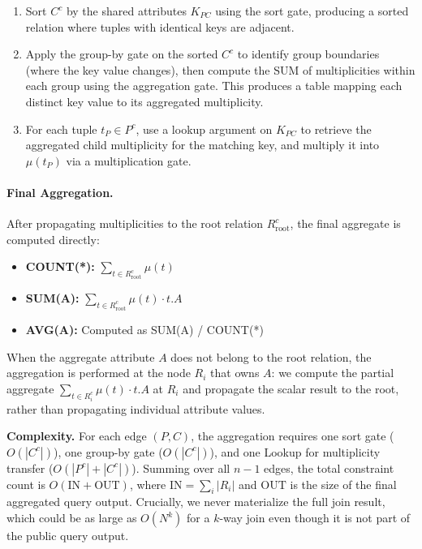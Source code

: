 \documentclass[sigconf]{acmart}
\begin{document}
\begin{enumerate}[leftmargin=*]
    \item Sort $C^c$ by the shared attributes $K_{PC}$ using the sort gate, producing a sorted relation where tuples with identical keys are adjacent.

    \item Apply the group-by gate on the sorted $C^c$ to identify group boundaries (where the key value changes), then compute the SUM of multiplicities within each group using the aggregation gate. This produces a table mapping each distinct key value to its aggregated multiplicity.

    \item For each tuple $t_P \in P^c$, use a lookup argument on $K_{PC}$ to retrieve the aggregated child multiplicity for the matching key, and multiply it into $\mu(t_P)$ via a multiplication gate.
\end{enumerate}

\paragraph{Final Aggregation.}
After propagating multiplicities to the root relation $R_{\text{root}}^c$, the final aggregate is computed directly:
\begin{itemize}[leftmargin=*]
    \item \textbf{COUNT(*):} $\sum_{t \in R_{\text{root}}^c} \mu(t)$
    \item \textbf{SUM(A):} $\sum_{t \in R_{\text{root}}^c} \mu(t) \cdot t.A$
    \item \textbf{AVG(A):} Computed as SUM(A) / COUNT(*)
\end{itemize}

\noindent When the aggregate attribute $A$ does not belong to the root relation, the aggregation is performed at the node $R_i$ that owns $A$: we compute the partial aggregate $\sum_{t \in R_i^c} \mu(t) \cdot t.A$ at $R_i$ and propagate the scalar result to the root, rather than propagating individual attribute values.

\noindent\textbf{Complexity.}
For each edge $(P, C)$, the aggregation requires one sort gate ($O(|C^c|)$), one group-by gate ($O(|C^c|)$), and one Lookup for multiplicity transfer ($O(|P^c| + |C^c|)$). Summing over all $n-1$ edges, the total constraint count is $O(\mathrm{IN} + \mathrm{OUT})$, where $\mathrm{IN} = \sum_i |R_i|$ and $\mathrm{OUT}$ is the size of the final aggregated query output. Crucially, we never materialize the full join result, which could be as large as $O(N^k)$ for a $k$-way join even though it is not part of the public query output.
\end{document}
